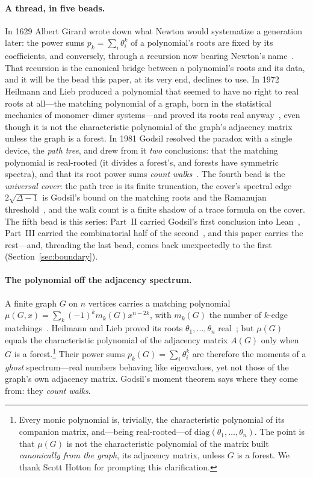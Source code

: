 \documentclass[11pt]{article}
\begin{document}
\paragraph{A thread, in five beads.} In 1629 Albert Girard wrote down what Newton would
systematize a generation later: the power sums $p_k=\sum_i\theta_i^k$ of a polynomial's roots are
fixed by its coefficients, and conversely, through a recursion now bearing Newton's
name~\cite{Girard,Macdonald}. That recursion is the canonical bridge between a polynomial's roots and
its data, and it will be the bead this paper, at its very end, declines to use. In 1972 Heilmann and
Lieb produced a polynomial that seemed to have no right to real roots at all---the matching
polynomial of a graph, born in the statistical mechanics of monomer--dimer systems---and proved its
roots real anyway~\cite{HeilmannLieb}, even though it is not the characteristic polynomial of the
graph's adjacency matrix unless the graph is a forest. In 1981 Godsil resolved the paradox with a single device, the
\emph{path tree}, and drew from it \emph{two} conclusions: that the matching polynomial is real-rooted
(it divides a forest's, and forests have symmetric spectra), and that its root power sums \emph{count
walks}~\cite{Godsil1981a,GodsilBook}. The fourth bead is the \emph{universal cover}: the path tree is
its finite truncation, the cover's spectral edge $2\sqrt{\Delta-1}$ is Godsil's bound on the matching
roots and the Ramanujan threshold~\cite{AngelFriedmanHoory,McKay,MSS}, and the walk count is a finite
shadow of a trace formula on the cover. The fifth bead is this series: Part~II carried Godsil's first
conclusion into Lean~\cite{PartII}, Part~III carried the combinatorial half of the
second~\cite{PartIII}, and this paper carries the rest---and, threading the last bead, comes back
unexpectedly to the first (Section~\ref{sec:boundary}).

\paragraph{The polynomial off the adjacency spectrum.} A finite graph $G$ on $n$ vertices carries a
matching polynomial $\mu(G,x)=\sum_k(-1)^k m_k(G)x^{n-2k}$, with $m_k(G)$ the number of $k$-edge
matchings~\cite{Farrell1979,LovaszPlummer}. Heilmann and Lieb proved its roots
$\theta_1,\dots,\theta_n$ real~\cite{HeilmannLieb}; but $\mu(G)$ equals the characteristic polynomial
of the adjacency matrix $A(G)$ only when $G$ is a forest.\footnote{Every monic polynomial is,
trivially, the characteristic polynomial of its companion matrix, and---being real-rooted---of
$\mathrm{diag}(\theta_1,\dots,\theta_n)$. The point is that $\mu(G)$ is not the characteristic
polynomial of the matrix built \emph{canonically from the graph}, its adjacency matrix, unless $G$ is a
forest. We thank Scott Hotton for prompting this clarification.} Their power sums
$p_k(G)=\sum_i\theta_i^k$ are therefore the moments of a \emph{ghost} spectrum---real numbers behaving
like eigenvalues, yet not those of the graph's own adjacency matrix. Godsil's moment theorem says where they come from: they \emph{count walks}.
\end{document}
